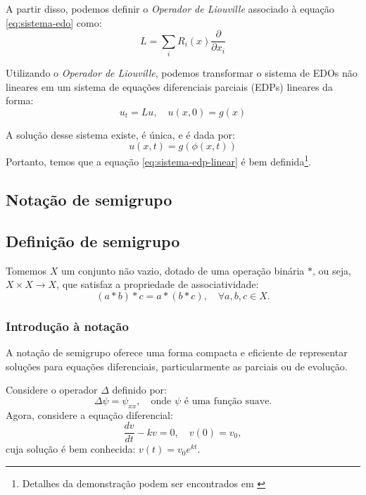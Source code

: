 \documentclass[12pt]{article}
\begin{document}
A partir disso, podemos definir o \textit{Operador de Liouville} associado à equação \eqref{eq:sistema-edo} como:
\begin{equation}
	L = \sum_i R_i(x) \frac{\partial}{\partial x_i}
	\label{eq:liouville-operator}
\end{equation}

Utilizando o \textit{Operador de Liouville}, podemos transformar o sistema de EDOs não lineares em um sistema de equações diferenciais parciais (EDPs) lineares da forma:
\begin{equation}
	u_t = Lu, \quad u(x,0) = g(x)
	\label{eq:sistema-edp-linear}
\end{equation}

A solução desse sistema existe, é única, e é dada por:
\begin{equation}
	u(x,t) = g(\phi(x,t))   
	\label{eq:solucao-sistema-edp-linear}
\end{equation}
Portanto, temos que a equação \eqref{eq:sistema-edp-linear} é bem definida\footnote{Detalhes da demonstração podem ser encontrados em \citet[p.~181-182]{Chorin2013}}.

\subsection{Notação de semigrupo}
\subsection{Definição de semigrupo}
Tomemos $X$ um conjunto não vazio, dotado de uma operação binária $ * $, ou seja, $ X \times X \to X $, que satisfaz a propriedade de associatividade:
\begin{equation*}
	(a * b) * c = a * (b * c), \quad \forall a,b,c \in X.
\end{equation*}

\subsubsection{Introdução à notação}
A notação de semigrupo oferece uma forma compacta e eficiente de representar soluções para equações diferenciais, particularmente as parciais ou de evolução.

Considere o operador $\Delta$ definido por:
\begin{equation*}
	\Delta \psi = \psi_{xx}, \quad \text{onde $\psi$ é uma função suave}.
\end{equation*}
Agora, considere a equação diferencial:
\begin{equation*}
	\frac{dv}{dt} - kv = 0, \quad v(0) = v_0,
\end{equation*}
cuja solução é bem conhecida: $ v(t) = v_0 e^{kt} $.
\end{document}
